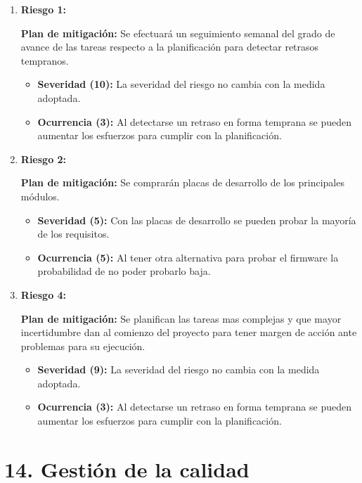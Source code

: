 \documentclass[
11pt, %
codirector, %
]{charter}
\begin{document}
\begin{enumerate} 
	\item[] \textbf{Riesgo 1:} 
	
	\textbf{Plan de mitigación:} Se efectuará un seguimiento semanal del grado de avance de las tareas respecto a la planificación para detectar retrasos tempranos.
	\begin{itemize}
		\item \textbf{Severidad (10):} La severidad del riesgo no cambia con la medida adoptada.
		\item \textbf{Ocurrencia (3):} Al detectarse un retraso en forma temprana se pueden aumentar los esfuerzos para cumplir con la planificación.
	\end{itemize} 
	\item[] \textbf{Riesgo 2:} 

	\textbf{Plan de mitigación:} Se comprarán placas de desarrollo de los principales módulos.
	\begin{itemize}
		\item \textbf{Severidad (5):} Con las placas de desarrollo se pueden probar la mayoría de los requisitos.
		\item \textbf{Ocurrencia (5):} Al tener otra alternativa para probar el firmware la probabilidad de no poder probarlo baja.
	\end{itemize} 
	\item[] \textbf{Riesgo 4:} 
	
	\textbf{Plan de mitigación:} Se planifican las tareas mas complejas y que mayor incertidumbre dan al comienzo del proyecto para tener margen de acción ante problemas para su ejecución.
	\begin{itemize}
		\item \textbf{Severidad (9):} La severidad del riesgo no cambia con la medida adoptada.
		\item \textbf{Ocurrencia (3):} Al detectarse un retraso en forma temprana se pueden aumentar los esfuerzos para cumplir con la planificación.
	\end{itemize} 

\end{enumerate}



\section{14. Gestión de la calidad}
\label{sec:calidad}
\end{document}
